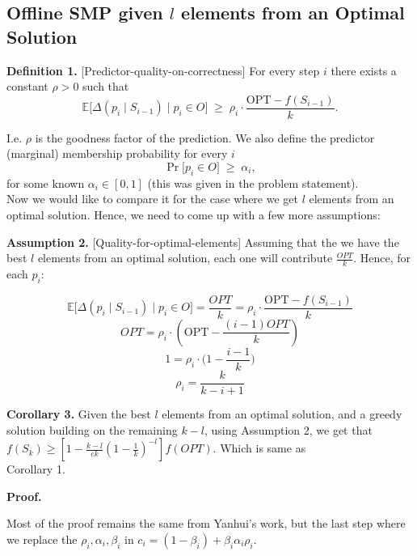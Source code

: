 \documentclass{article}
\begin{document}
\subsection{Offline SMP given $l$ elements from an Optimal Solution}

\textbf{Definition 1.} [Predictor-quality-on-correctness]\label{ass:rho}
For every step $i$ there exists a constant $\rho>0$ such that
\[
\mathbb{E}\big[\Delta(p_i\mid S_{i-1}) \mid p_i\in O\big]
\;\ge\; \rho_i \cdot\frac{\mathrm{OPT}-f(S_{i-1})}{k}.
\]

\noindent I.e. $\rho$ is the goodness factor of the prediction. We also define the predictor (marginal) membership probability for every $i$
\[
\Pr\big[p_i\in O\big] \;\ge\; \alpha_i,
\]
for some known $\alpha_i\in[0,1]$ (this was given in the problem statement). \\

Now we would like to compare it for the case where we get $l$ elements from an optimal solution. Hence, we need to come up with a few more assumptions:



\textbf{Assumption 2.} [Quality-for-optimal-elements] Assuming that the we have the best $l$ elements from an optimal solution, each one will contribute $\frac{OPT}{k}$. Hence, for each $p_i$:

\[
    \mathbb{E}\big[\Delta(p_i\mid S_{i-1}) \mid p_i\in O\big] = \frac{OPT}{k} = \rho_i\cdot\frac{\mathrm{OPT}-f(S_{i-1})}{k} 
    \]
    \[
    OPT = \rho_i\cdot(\mathrm{OPT}-\frac{(i - 1)OPT}{k}) \]
    \[
     1 = \rho_i\cdot\Big(1-\frac{i - 1}{k}\Big) \]
     \[
     \rho_i = \frac{k}{k - i + 1}
\]

\textbf{Corollary 3.} Given the best $l$ elements from an optimal solution, and a greedy solution building on the remaining $k - l$, using Assumption 2, we get that $f(S_k) \geq [1 - \frac{k - l}{ek} (1 - \frac{1}{k})^{-l}]f(OPT)$. Which is same as \\Corollary 1.

\textbf{Proof.}

Most of the proof remains the same from Yanhui's work, but the last step where we replace the $\rho_i, \alpha_i, \beta_i$ in $c_i = (1 - \beta_i) + \beta_i\alpha_i\rho_i$.
\end{document}

